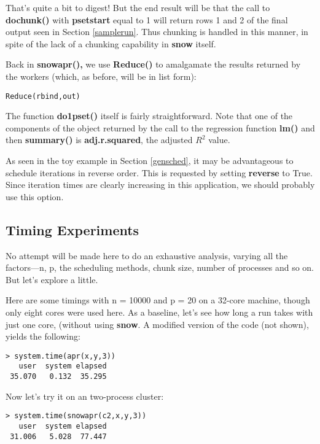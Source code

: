 That's quite a bit to digest!  But the end result will be that the call
to {\bf dochunk()} with {\bf psetstart} equal to 1 will return rows 1 and
2 of the final output seen in Section \ref{samplerun}.  Thus chunking is
handled in this manner, in spite of the lack of a chunking capability in
{\bf snow} itself.

Back in {\bf snowapr(),} we use {\bf Reduce()} to amalgamate the results
returned by the workers (which, as before, will be in list form):

\begin{lstlisting}
Reduce(rbind,out)
\end{lstlisting}

The function {\bf do1pset()} itself is fairly straightforward.  Note
that one of the components of the object returned by the call to the
regression function {\bf lm()} and then {\bf summary()} is {\bf
adj.r.squared}, the adjusted $R^2$ value.

As seen in the toy example in Section \ref{gensched}, it may be
advantageous to schedule iterations in reverse order.  This is requested
by setting {\bf reverse} to True.  Since iteration times are clearly
increasing in this application, we should probably use this option.

\subsection{Timing Experiments}

No attempt will be made here to do an exhaustive analysis, varying all
the factors---n, p, the scheduling methods, chunk size, number of
processes and so on.  But let's explore a little.

Here are some timings with n = 10000 and p = 20 on a 32-core machine,
though only eight cores were used here.  As a baseline, let's see how
long a run takes with just one core, (without using {\bf snow}.  A
modified version of the code (not shown), yields the following:

\begin{Verbatim}[fontsize=\relsize{-1}]
> system.time(apr(x,y,3))
   user  system elapsed
 35.070   0.132  35.295
\end{Verbatim}

Now let's try it on an two-process cluster:

\begin{Verbatim}[fontsize=\relsize{-1}]
> system.time(snowapr(c2,x,y,3))
   user  system elapsed
 31.006   5.028  77.447
\end{Verbatim}

